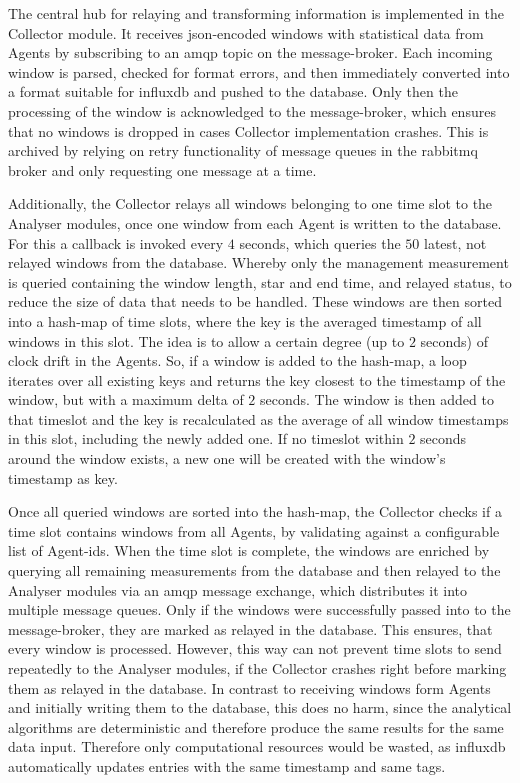 The central hub for relaying and transforming information is implemented in the Collector module.
It receives \gls{json}-encoded windows with statistical data from Agents by subscribing to an \gls{amqp} topic on the message-broker. Each incoming window is parsed, checked for format errors, and then immediately converted into a format suitable for \gls{influxdb} and pushed to the database. Only then the processing of the window is acknowledged to the message-broker, which ensures that no windows is dropped in cases Collector implementation crashes. This is archived by relying on retry functionality of message queues in the \gls{rabbitmq} broker and only requesting one message at a time.

Additionally, the Collector relays all windows belonging to one time slot to the Analyser modules, once one window from each Agent is written to the database.
For this a callback is invoked every $4$ seconds, which queries the $50$ latest, not relayed windows from the database. Whereby only the management measurement is queried containing the window length, star and end time, and relayed status, to reduce the size of data that needs to be handled.
These windows are then sorted into a hash-map of time slots, where the key is the averaged timestamp of all windows in this slot. The idea is to allow a certain degree (up to $2$ seconds) of clock drift in the Agents. 
So, if a window is added to the hash-map, a loop iterates over all existing keys and returns the key closest to the timestamp of the window, but with a maximum delta of $2$ seconds.
The window is then added to that timeslot and the key is recalculated as the average of all window timestamps in this slot, including the newly added one.
If no timeslot within $2$ seconds around the window exists, a new one will be created with the window's timestamp as key.

Once all queried windows are sorted into the hash-map, the Collector checks if a time slot contains windows from all Agents, by validating against a configurable list of Agent-ids.
When the time slot is complete, the windows are enriched by querying all remaining measurements from the database and then relayed to the Analyser modules via an \gls{amqp} message exchange, which distributes it into multiple message queues.
Only if the windows were successfully passed into to the message-broker, they are marked as relayed in the database. This ensures, that every window is processed. However, this way can not prevent time slots to send repeatedly to the Analyser modules, if the Collector crashes right before marking them as relayed in the database. In contrast to receiving windows form Agents and initially writing them to the database, this does no harm, since the analytical algorithms are deterministic and therefore produce the same results for the same data input. Therefore only computational resources would be wasted, as \gls{influxdb} automatically updates entries with the same timestamp and same tags.

